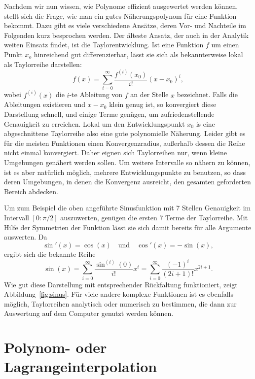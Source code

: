 Nachdem wir nun wissen, wie Polynome effizient ausgewertet werden
können, stellt sich die Frage, wie man ein gutes Näherungspolynom für
eine Funktion bekommt. Dazu gibt es viele verschiedene Ansätze, deren
Vor- und Nachteile im Folgenden kurz besprochen werden. Der älteste
Ansatz, der auch in der Analytik weiten Einsatz findet, ist die
Taylorentwicklung.  Ist eine Funktion $f$ um einen Punkt $x_o$
hinreichend gut differenzierbar, lässt sie sich als bekannterweise
lokal als Taylorreihe darstellen:
\begin{equation}
  f(x) = \sum_{i=0}^\infty \frac{f^{(i)}(x_0)}{i!} (x-x_0)^i,
  \label{eq:taylor}
\end{equation}
wobei $f^{(i)}(x)$ die $i$-te Ableitung von $f$ an der Stelle $x$
bezeichnet.  Falls die Ableitungen existieren und $x-x_0$ klein genug
ist, so konvergiert diese Darstellung schnell, und einige Terme
genügen, um zufriedenstellende Genauigkeit zu erreichen. Lokal um den
Entwicklungspunkt $x_0$ is eine abgeschnittene Taylorreihe also eine
gute polynomielle Näherung. Leider gibt es für die meisten Funktionen
einen Konvergenzradius, außerhalb dessen die Reihe nicht einmal
konvergiert. Daher eignen sich Taylorreihen nur, wenn kleine 
Umgebungen genähert werden sollen. Um weitere Intervalle so nähern zu
können, ist es aber natürlich möglich, mehrere Entwicklungspunkte zu
benutzen, so dass deren Umgebungen, in denen die Konvergenz ausreicht,
den gesamten geforderten Bereich abdecken.

Um  zum  Beispiel die  oben  angeführte  Sinusfunktion  mit 7  Stellen
Genauigkeit im Intervall $[0:\pi/2]$  auszuwerten, genügen die ersten 7
Terme der Taylorreihe. Mit Hilfe der Symmetrien der Funktion lässt sie
sich damit bereits für alle Argumente auswerten. Da
\begin{equation*}
  \sin'(x) = \cos(x) \quad\text{und} \quad \cos'(x) = -\sin(x),
\end{equation*}
ergibt sich die bekannte Reihe
\begin{equation}
  \sin(x) = \sum_{i=0}^\infty \frac{\sin^{(i)}(0)}{i!} x^i =
  \sum_{i=0}^\infty \frac{(-1)^i}{(2i+1)!} x^{2i+1}.
\end{equation}
Wie gut diese Darstellung mit entsprechender Rückfaltung funktioniert,
zeigt Abbildung~\ref{fig:sinus}.  Für viele andere komplexe Funktionen
ist es ebenfalls möglich, Taylorreihen analytisch oder numerisch zu
bestimmen, die dann zur Auswertung auf dem Computer genutzt werden
können.

\section{Polynom- oder Lagrangeinterpolation}

